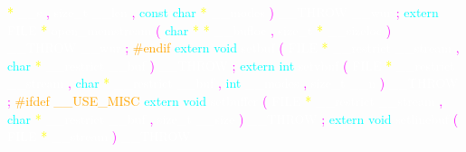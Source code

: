 \textcolor{yellow}{*} 
\textcolor{white}{\_\_s} 
\textcolor{magenta}{,} 
\textcolor{white}{size\_t} 
\textcolor{white}{\_\_len} 
\textcolor{magenta}{,} 
\textcolor{cyan}{const} 
\textcolor{cyan}{char} 
\textcolor{yellow}{*} 
\textcolor{white}{\_\_modes} 
\textcolor{magenta}{)} 
\textcolor{white}{\_\_THROW} 
\textcolor{white}{\_\_wur} 
\textcolor{magenta}{;} 
\textcolor{cyan}{extern} 
\textcolor{white}{FILE} 
\textcolor{yellow}{*} 
\textcolor{white}{open\_memstream} 
\textcolor{magenta}{(} 
\textcolor{cyan}{char} 
\textcolor{yellow}{*} 
\textcolor{yellow}{*} 
\textcolor{white}{\_\_bufloc} 
\textcolor{magenta}{,} 
\textcolor{white}{size\_t} 
\textcolor{yellow}{*} 
\textcolor{white}{\_\_sizeloc} 
\textcolor{magenta}{)} 
\textcolor{white}{\_\_THROW} 
\textcolor{white}{\_\_wur} 
\textcolor{magenta}{;} 
\textcolor{orange}{\#endif} 
\textcolor{cyan}{extern} 
\textcolor{cyan}{void} 
\textcolor{white}{setbuf} 
\textcolor{magenta}{(} 
\textcolor{white}{FILE} 
\textcolor{yellow}{*} 
\textcolor{white}{\_\_restrict} 
\textcolor{white}{\_\_stream} 
\textcolor{magenta}{,} 
\textcolor{cyan}{char} 
\textcolor{yellow}{*} 
\textcolor{white}{\_\_restrict} 
\textcolor{white}{\_\_buf} 
\textcolor{magenta}{)} 
\textcolor{white}{\_\_THROW} 
\textcolor{magenta}{;} 
\textcolor{cyan}{extern} 
\textcolor{cyan}{int} 
\textcolor{white}{setvbuf} 
\textcolor{magenta}{(} 
\textcolor{white}{FILE} 
\textcolor{yellow}{*} 
\textcolor{white}{\_\_restrict} 
\textcolor{white}{\_\_stream} 
\textcolor{magenta}{,} 
\textcolor{cyan}{char} 
\textcolor{yellow}{*} 
\textcolor{white}{\_\_restrict} 
\textcolor{white}{\_\_buf} 
\textcolor{magenta}{,} 
\textcolor{cyan}{int} 
\textcolor{white}{\_\_modes} 
\textcolor{magenta}{,} 
\textcolor{white}{size\_t} 
\textcolor{white}{\_\_n} 
\textcolor{magenta}{)} 
\textcolor{white}{\_\_THROW} 
\textcolor{magenta}{;} 
\textcolor{orange}{\#ifdef	\_\_USE\_MISC} 
\textcolor{cyan}{extern} 
\textcolor{cyan}{void} 
\textcolor{white}{setbuffer} 
\textcolor{magenta}{(} 
\textcolor{white}{FILE} 
\textcolor{yellow}{*} 
\textcolor{white}{\_\_restrict} 
\textcolor{white}{\_\_stream} 
\textcolor{magenta}{,} 
\textcolor{cyan}{char} 
\textcolor{yellow}{*} 
\textcolor{white}{\_\_restrict} 
\textcolor{white}{\_\_buf} 
\textcolor{magenta}{,} 
\textcolor{white}{size\_t} 
\textcolor{white}{\_\_size} 
\textcolor{magenta}{)} 
\textcolor{white}{\_\_THROW} 
\textcolor{magenta}{;} 
\textcolor{cyan}{extern} 
\textcolor{cyan}{void} 
\textcolor{white}{setlinebuf} 
\textcolor{magenta}{(} 
\textcolor{white}{FILE} 
\textcolor{yellow}{*} 
\textcolor{white}{\_\_stream} 
\textcolor{magenta}{)} 
\textcolor{white}{\_\_THROW} 
